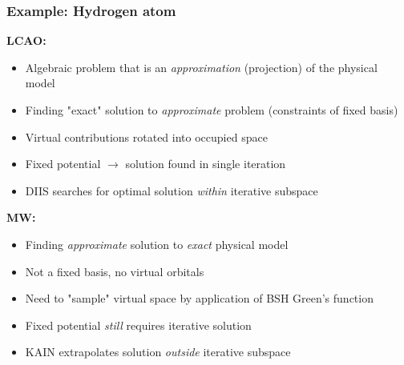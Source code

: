 \begin{frame}
  \frametitle{Example: Hydrogen atom}

  \textbf{LCAO:}
  \begin{itemize}
    \item Algebraic problem that is an \emph{approximation} (projection) of the physical model
    \item Finding "exact" solution to \emph{approximate} problem (constraints of fixed basis)
    \item Virtual contributions rotated into occupied space
    \item Fixed potential $\rightarrow$ solution found in single iteration
    \item DIIS searches for optimal solution \emph{within} iterative subspace
  \end{itemize}

  \vspace{5mm}

  \textbf{MW:}
  \begin{itemize}
    \item Finding \emph{approximate} solution to \emph{exact} physical model
    \item Not a fixed basis, no virtual orbitals
    \item Need to "sample" virtual space by application of BSH Green's function
    \item Fixed potential \emph{still} requires iterative solution
    \item KAIN extrapolates solution \emph{outside} iterative subspace
  \end{itemize}
\end{frame}

